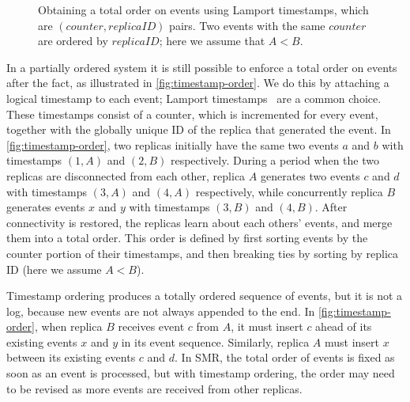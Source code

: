 \documentclass[sigconf,nonacm]{acmart}
\begin{document}
\begin{figure}
  \caption{Obtaining a total order on events using Lamport timestamps, which are $(\mathit{counter}, \mathit{replicaID})$ pairs. Two events with the same $\mathit{counter}$ are ordered by $\mathit{replicaID}$; here we assume that $A<B$.}
  \label{fig:timestamp-order}
\end{figure}

In a partially ordered system it is still possible to enforce a total order on events after the fact, as illustrated in \autoref{fig:timestamp-order}.
We do this by attaching a logical timestamp to each event; Lamport timestamps~\cite{Lamport:1978} are a common choice.
These timestamps consist of a counter, which is incremented for every event, together with the globally unique ID of the replica that generated the event.
In \autoref{fig:timestamp-order}, two replicas initially have the same two events $a$ and $b$ with timestamps $(1,A)$ and $(2,B)$ respectively.
During a period when the two replicas are disconnected from each other, replica $A$ generates two events $c$ and $d$ with timestamps $(3,A)$ and $(4,A)$ respectively, while concurrently replica $B$ generates events $x$ and $y$ with timestamps $(3,B)$ and $(4,B)$.
After connectivity is restored, the replicas learn about each others' events, and merge them into a total order.
This order is defined by first sorting events by the counter portion of their timestamps, and then breaking ties by sorting by replica ID (here we assume $A<B$).

Timestamp ordering produces a totally ordered sequence of events, but it is not a log, because new events are not always appended to the end.
In \autoref{fig:timestamp-order}, when replica $B$ receives event $c$ from $A$, it must insert $c$ ahead of its existing events $x$ and $y$ in its event sequence.
Similarly, replica $A$ must insert $x$ between its existing events $c$ and $d$.
In SMR, the total order of events is fixed as soon as an event is processed, but with timestamp ordering, the order may need to be revised as more events are received from other replicas.
\end{document}
